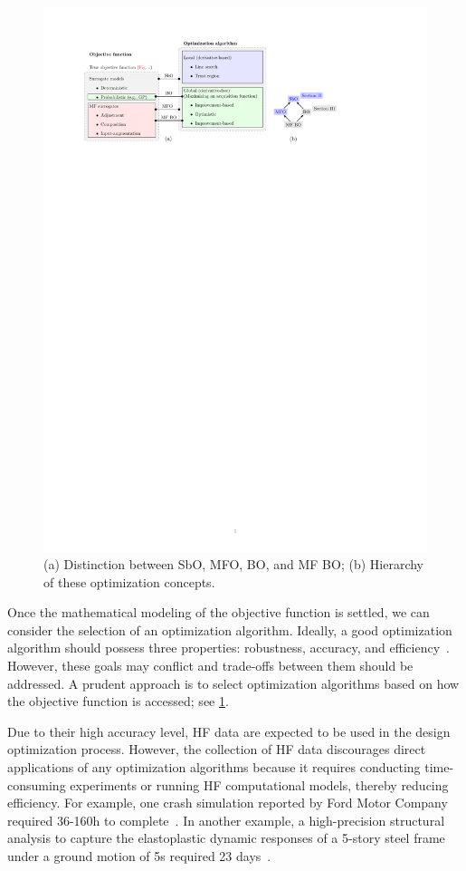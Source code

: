 \documentclass[journal ]{new-aiaa}
\begin{document}
	\begin{figure}
		\centering
		\includegraphics[scale=0.82]{Fig2.pdf}
		\caption{(a) Distinction between SbO, MFO, BO, and MF BO; (b) Hierarchy of these optimization concepts.}
		\label{Fig-2}
	\end{figure}
	
	Once the mathematical modeling of the objective function is settled, we can consider the selection of an optimization algorithm.
	Ideally, a good optimization algorithm should possess three properties: robustness, accuracy, and efficiency~\citep{Nocedal2006}.
	However, these goals may conflict and trade-offs between them should be addressed.
	A prudent approach is to select optimization algorithms based on how the objective function is accessed; see \cref{Fig-2}.
	
	Due to their high accuracy level, HF data are expected to be used in the design optimization process.
	However, the collection of HF data discourages direct applications of any optimization algorithms because it requires conducting time-consuming experiments or running HF computational models, thereby reducing efficiency.
	For example, one crash simulation reported by Ford Motor Company required 36-160h to complete~\citep{Wang2006}.
	In another example, a high-precision structural analysis to capture the elastoplastic dynamic responses of a 5-story steel frame under a ground motion of 5s required 23 days~\citep{Ohsaki2009}.
	
\end{document}
